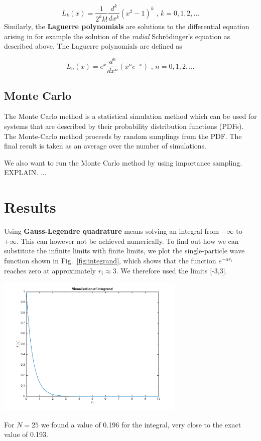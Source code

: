 \documentclass{article}
\begin{document}
\begin{multicols}{2}
\begin{equation}
	L_k(x) = \frac{1}{2^k k!} \frac{d^k}{dx^k} (x^2 - 1)^k \textrm{ , } k = 0,1,2, \dots
\end{equation}
Similarly, the \textbf{Laguerre polynomials} are solutions to the differential equation arising in for example the solution of the \textit{radial} Schr\"{o}dinger's equation as described above. The Laguerre polynomials are defined as

\begin{equation}
	L_n(x) = e^x \frac{d^n}{dx^n} (x^n e^{-x}) \textrm{ , } n = 0,1,2, \dots
\end{equation}


\subsection{Monte Carlo}
The Monte Carlo method is a statistical simulation method which can be used for systems that are described by their probability distribution functions (PDFs). The Monte-Carlo method proceeds by random samplings from the PDF. The final result is taken as an average over the number of simulations.

We also want to run the Monte Carlo method by using importance sampling. EXPLAIN.
... 


\section{Results}

Using \textbf{Gauss-Legendre quadrature} means solving an integral from $- \infty$ to $+ \infty$. This can however not be achieved numerically. To find out how we can substitute the infinite limits with finite limits, we plot the single-particle wave function shown in Fig.~\ref{fig:integrand}, which shows that the function $e^{-\alpha r_i}$ reaches zero at approximately $r_i \approx 3$. We therefore used the limits [-3,3].

\begin{center}
	\includegraphics[width=90mm]{integrand.png} 	
	\label{fig:integrand}
\end{center}
For $N = 25$ we found a value of 0.196 for the integral, very close to the exact value of 0.193. 


\end{multicols}
\end{document}
